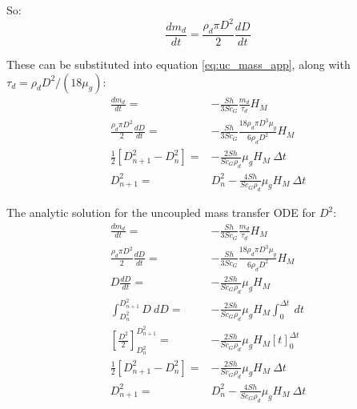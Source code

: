 \documentclass[../Interim_Report_Master]{subfiles}
\begin{document}
So:
\begin{equation}
\frac{dm_d}{dt} = \frac{\rho_d \pi D^2}{2}\frac{dD}{dt}
\end{equation}

These can be substituted into equation \ref{eq:uc_mass_app}, along with $\tau_d = \rho_d D^2/(18\mu_g)$:
\begin{subequations}
	\begin{align}
	\frac{dm_d}{dt} =& -\frac{Sh}{3Sc_G}\frac{m_d}{\tau_d}H_M \\
	\frac{\rho_d \pi D^2}{2}\frac{dD}{dt} =& -\frac{Sh}{3Sc_G}\frac{18 \rho_d \pi D^3 \mu_g}{6\rho_d D^2}H_M \\
	\frac{1}{2}\left[D^2_{n+1} - D^2_n\right] =& -\frac{2Sh}{Sc_G\rho_d }\mu_g H_M ~\Delta t \\
	D^2_{n+1} =& D_n^2 -\frac{4Sh}{Sc_G\rho_d }\mu_g H_M ~\Delta t
	\end{align}
\end{subequations}

The analytic solution for the uncoupled mass transfer ODE for $D^2$:
\begin{subequations}
\begin{align}
\frac{dm_d}{dt} =& -\frac{Sh}{3Sc_G}\frac{m_d}{\tau_d}H_M \\
\frac{\rho_d \pi D^2}{2}\frac{dD}{dt} =& -\frac{Sh}{3Sc_G}\frac{18 \rho_d \pi D^3 \mu_g}{6\rho_d D^2}H_M \\
D\frac{dD}{dt} =& -\frac{2Sh}{Sc_G\rho_d }\mu_g H_M  \\
\int_{D^2_n}^{D^2_{n+1}}D~dD =& -\frac{2Sh}{Sc_G\rho_d }\mu_g H_M \int_{0}^{\Delta t}~dt \\
\left[\frac{D^2}{2}\right]_{D^2_n}^{D^2_{n+1}} =& -\frac{2Sh}{Sc_G\rho_d }\mu_g H_M \left[t\right]_{0}^{\Delta t} \\
\frac{1}{2}\left[D^2_{n+1} - D^2_n\right] =& -\frac{2Sh}{Sc_G\rho_d }\mu_g H_M ~\Delta t \\
D^2_{n+1} =& D^2_n -\frac{4Sh}{Sc_G\rho_d }\mu_g H_M ~\Delta t
\end{align}
\end{subequations}
\end{document}
